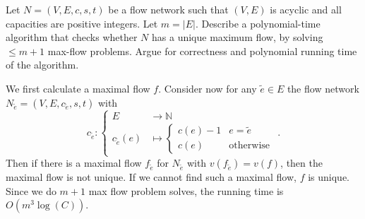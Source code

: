 \documentclass{article}
\begin{document}
\begin{exercise}
    Let $N=(V,E,c,s,t)$ be a flow network such that $(V,E)$ is acyclic and all capacities are positive integers. Let $m= |E|$. Describe a polynomial-time algorithm that checks whether $N$ has a unique maximum flow, by solving $\leq m+1$ max-flow problems. Argue for correctness and polynomial running time of the algorithm.
\end{exercise}
\begin{solving}
    We first calculate a maximal flow $f$. Consider now for any $\tilde e\in E$ the flow network $N_{\tilde e} = (V,E,c_{\tilde e}, s, t)$ with \begin{equation*}
        c_{\tilde e}: \begin{cases}
            E & \to \mathbb N\\
            c_{\tilde e}(e) &\mapsto\begin{cases}
                c(e)-1 & e = \tilde e\\
                c(e) & \text{otherwise}
            \end{cases}
        \end{cases}.
    \end{equation*}
    Then if there is a  maximal flow $f_{\tilde e}$ for $N_{\tilde e}$ with $v(f_{\tilde e}) = v(f)$, then the maximal flow is not unique. If we cannot find such a maximal flow, $f$ is unique. \\
    Since we do $m+1$ max flow problem solves, the running time is $O(m^3\log(C))$.
\end{solving}
\newpage
\end{document}

